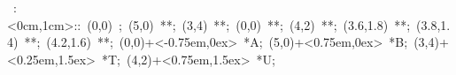 

\hbox{
\xy    <1cm,0cm>:<0cm,1cm>::
       (0,0) ; (5,0) **\dir{-}; 
       (3,4) **\dir{-}; (0,0) **\dir{-};
       (4,2) **\dir{-};
       (3.6,1.8) **\dir{-}; (3.8,1.4) **\dir{-};
       (4.2,1.6) **\dir{-};
       (0,0)+<-0.75em,0ex> *{A};
       (5,0)+<0.75em,0ex> *{B};
       (3,4)+<0.25em,1.5ex> *{T};
       (4,2)+<0.75em,1.5ex> *{U};
       \endxy}
	   
